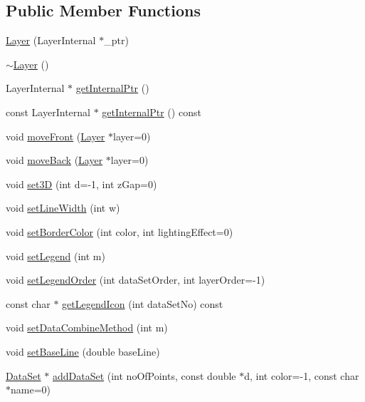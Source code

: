 \subsection*{Public Member Functions}
\begin{DoxyCompactItemize}
\item 
\hyperlink{class_layer_a1dd3e43897b7c51ba77cf9f119b2b67c}{Layer} (Layer\+Internal $\ast$\+\_\+ptr)
\item 
\hyperlink{class_layer_a1b1ba4804451dfe6cc357194e42762ae}{$\sim$\+Layer} ()
\item 
Layer\+Internal $\ast$ \hyperlink{class_layer_abac4fdc0a21c39be0ac30f0d2448c3ff}{get\+Internal\+Ptr} ()
\item 
const Layer\+Internal $\ast$ \hyperlink{class_layer_a52fb5ed2d62c31236f16a81bafe76e01}{get\+Internal\+Ptr} () const
\item 
void \hyperlink{class_layer_af6c5ffa1b6b50305dc0f64ed62ee97a3}{move\+Front} (\hyperlink{class_layer}{Layer} $\ast$layer=0)
\item 
void \hyperlink{class_layer_a20e9919153e863772cdbe88bcc8cf0ea}{move\+Back} (\hyperlink{class_layer}{Layer} $\ast$layer=0)
\item 
void \hyperlink{class_layer_abea35b3036cda42bbcb7f483004ebf8e}{set3D} (int d=-\/1, int z\+Gap=0)
\item 
void \hyperlink{class_layer_aab577b53410b150fc84dbb5dd502ff5f}{set\+Line\+Width} (int w)
\item 
void \hyperlink{class_layer_a5ca95189af8b33edce8e9a6bf28259b1}{set\+Border\+Color} (int color, int lighting\+Effect=0)
\item 
void \hyperlink{class_layer_a9e9f2fc29249b58cf56048c7c2861de7}{set\+Legend} (int m)
\item 
void \hyperlink{class_layer_a8cfa48350575091c07874b5a716a46a2}{set\+Legend\+Order} (int data\+Set\+Order, int layer\+Order=-\/1)
\item 
const char $\ast$ \hyperlink{class_layer_aed467bc0e94be04708d50397cd9d068e}{get\+Legend\+Icon} (int data\+Set\+No) const
\item 
void \hyperlink{class_layer_a147a8f0cb1c34a9d778a285cbc2d5fba}{set\+Data\+Combine\+Method} (int m)
\item 
void \hyperlink{class_layer_a62eada97375feac765004c6a99095531}{set\+Base\+Line} (double base\+Line)
\item 
\hyperlink{class_data_set}{Data\+Set} $\ast$ \hyperlink{class_layer_a6a53587a5c2a6800573fb4c7a782887b}{add\+Data\+Set} (int no\+Of\+Points, const double $\ast$d, int color=-\/1, const char $\ast$name=0)

\end{DoxyCompactItemize}
